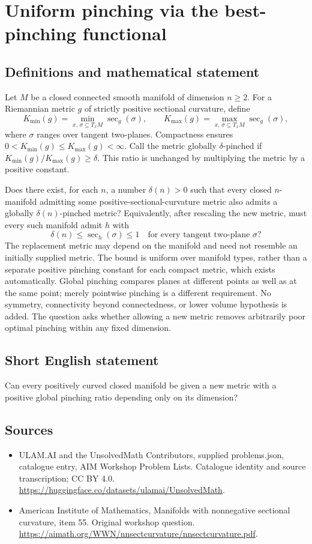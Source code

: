 \documentclass[11pt,a4paper]{article}
\begin{document}
\section*{Uniform pinching via the best-pinching functional}\label{statement}

\subsection{Definitions and mathematical statement}
Let $M$ be a closed connected smooth manifold of dimension $n\geq2$.
For a Riemannian metric $g$ of strictly positive sectional curvature, define
\[
 K_{\min}(g)=\min_{x,\,\sigma\subseteq T_xM}\sec_g(\sigma),
 \qquad
 K_{\max}(g)=\max_{x,\,\sigma\subseteq T_xM}\sec_g(\sigma),
\]
where $\sigma$ ranges over tangent two-planes.
Compactness ensures $0<K_{\min}(g)\leq K_{\max}(g)<\infty$.
Call the metric globally $\delta$-pinched if
$K_{\min}(g)/K_{\max}(g)\geq\delta$.
This ratio is unchanged by multiplying the metric by a positive constant.

Does there exist, for each $n$, a number $\delta(n)>0$ such that every closed $n$-manifold admitting some positive-sectional-curvature metric also admits a globally $\delta(n)$-pinched metric?
Equivalently, after rescaling the new metric, must every such manifold admit $h$ with
\[
 \delta(n)\leq\sec_h(\sigma)\leq1
 \quad\text{for every tangent two-plane }\sigma?
\]
The replacement metric may depend on the manifold and need not resemble an initially supplied metric.
The bound is uniform over manifold types, rather than a separate positive pinching constant for each compact metric, which exists automatically.
Global pinching compares planes at different points as well as at the same point; merely pointwise pinching is a different requirement.
No symmetry, connectivity beyond connectedness, or lower volume hypothesis is added.
The question asks whether allowing a new metric removes arbitrarily poor optimal pinching within any fixed dimension.
\subsection{Short English statement}
Can every positively curved closed manifold be given a new metric with a positive global pinching ratio depending only on its dimension?
\subsection{Sources}
\begin{itemize}
\item[S1] ULAM.AI and the UnsolvedMath Contributors, supplied problems.json, catalogue entry, AIM Workshop Problem Lists. Catalogue identity and source transcription; CC BY 4.0.
\url{https://huggingface.co/datasets/ulamai/UnsolvedMath}.
\item[S2] American Institute of Mathematics, Manifolds with nonnegative sectional curvature, item 55. Original workshop question.
\url{https://aimath.org/WWN/nnsectcurvature/nnsectcurvature.pdf}.
\end{itemize}
\end{document}
